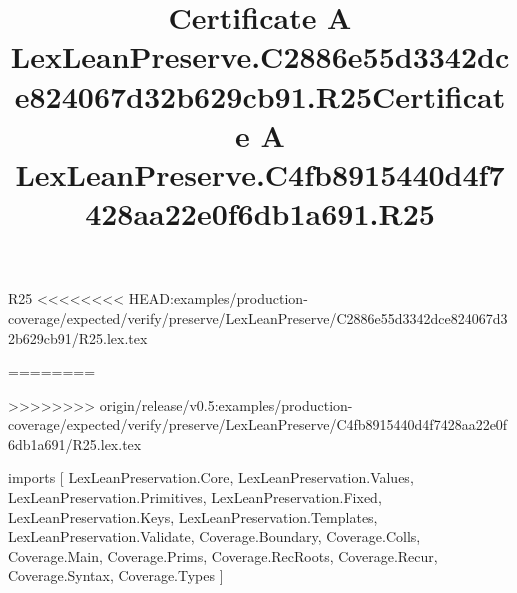 \begin{lexlean}{R25}
<<<<<<<< HEAD:examples/production-coverage/expected/verify/preserve/LexLeanPreserve/C2886e55d3342dce824067d32b629cb91/R25.lex.tex
\title{Certificate A LexLeanPreserve.C2886e55d3342dce824067d32b629cb91.R25}
========
\title{Certificate A LexLeanPreserve.C4fb8915440d4f7428aa22e0f6db1a691.R25}
>>>>>>>> origin/release/v0.5:examples/production-coverage/expected/verify/preserve/LexLeanPreserve/C4fb8915440d4f7428aa22e0f6db1a691/R25.lex.tex
\begin{coremodule}
imports [
  LexLeanPreservation.Core,
  LexLeanPreservation.Values,
  LexLeanPreservation.Primitives,
  LexLeanPreservation.Fixed,
  LexLeanPreservation.Keys,
  LexLeanPreservation.Templates,
  LexLeanPreservation.Validate,
  Coverage.Boundary,
  Coverage.Colls,
  Coverage.Main,
  Coverage.Prims,
  Coverage.RecRoots,
  Coverage.Recur,
  Coverage.Syntax,
  Coverage.Types
]


\end{coremodule}
\end{lexlean}
